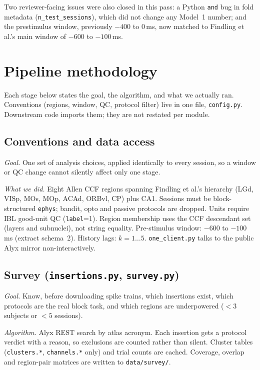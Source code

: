 \documentclass[11pt,a4paper]{article}
\begin{document}
Two reviewer-facing issues were also closed in this pass: a Python
\texttt{and} bug in fold metadata (\texttt{n\_test\_sessions}), which did not
change any Model~1 number; and the prestimulus window, previously $-400$ to
$0$\,ms, now matched to Findling et al.'s main window of $-600$ to
$-100$\,ms.

\section{Pipeline methodology}

Each stage below states the goal, the algorithm, and what we actually ran.
Conventions (regions, window, QC, protocol filter) live in one file,
\texttt{config.py}. Downstream code imports them; they are not restated per
module.

\subsection{Conventions and data access}

\textit{Goal.} One set of analysis choices, applied identically to every
session, so a window or QC change cannot silently affect only one stage.

\textit{What we did.} Eight Allen CCF regions spanning Findling et al.'s
hierarchy (LGd, VISp, MOs, MOp, ACAd, ORBvl, CP) plus CA1. Sessions must be
block-structured \texttt{ephys}; bandit, opto and passive protocols are
dropped. Units require IBL good-unit QC (\texttt{label}=1). Region membership
uses the CCF descendant set (layers and subnuclei), not string equality.
Pre-stimulus window: $-600$ to $-100$\,ms (extract schema~2). History lags:
$k=1{\ldots}5$. \texttt{one\_client.py} talks to the public Alyx mirror
non-interactively.

\subsection{Survey (\texttt{insertions.py}, \texttt{survey.py})}

\textit{Goal.} Know, before downloading spike trains, which insertions exist,
which protocols are the real block task, and which regions are underpowered
($<3$ subjects or $<5$ sessions).

\textit{Algorithm.} Alyx REST search by atlas acronym. Each insertion gets a
protocol verdict with a reason, so exclusions are counted rather than silent.
Cluster tables (\texttt{clusters.*}, \texttt{channels.*} only) and trial
counts are cached. Coverage, overlap and region-pair matrices are written to
\texttt{data/survey/}.
\end{document}
